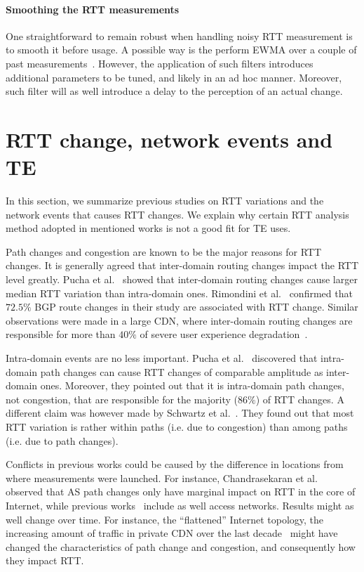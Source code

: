 \paragraph{Smoothing the RTT measurements} One straightforward to remain robust when handling noisy RTT measurement is to smooth it before usage. A possible way is the perform \ac{EWMA} over a couple of past measurements~\cite{Akella2008}. However, the application of such filters introduces additional parameters to be tuned, and likely in an ad hoc manner. Moreover, such filter will as well introduce a delay to the perception of an actual change.


\section{RTT change, network events and TE}
\label{sec:rtt_path}
In this section, we summarize previous studies on RTT variations and the network events that causes RTT changes.
We explain why certain RTT analysis method adopted in mentioned works is not a good fit for TE uses.

Path changes and congestion are known to be the major reasons for RTT changes.
It is generally agreed that inter-domain routing changes impact the RTT level greatly.
Pucha et al.~\cite{Pucha2007} showed that inter-domain routing changes cause larger median RTT variation than intra-domain ones.
Rimondini et al.~\cite{Rimondini2014} confirmed that $72.5\%$ BGP route changes in their study are associated with RTT change.
Similar observations were made in a large \ac{CDN}, where inter-domain routing changes are responsible for more than $40\%$ of severe user experience degradation~\cite{Zhu2012}.

Intra-domain events are no less important. Pucha et al.~\cite{Pucha2007} discovered that intra-domain path changes can cause RTT changes of comparable amplitude as inter-domain ones.
Moreover, they pointed out that it is intra-domain path changes, not congestion, that are responsible for the majority ($86\%$) of RTT changes. %
A different claim was however made by Schwartz et al.~\cite{Schwartz2010}. They found out that most RTT variation is rather within paths (i.e. due to congestion) than among paths (i.e. due to path changes).

Conflicts in previous works could be caused by the difference in locations from where measurements were launched.
For instance, Chandrasekaran et al.~\cite{Chandrasekaran} observed that AS path changes only have marginal impact on RTT in the core of Internet, while previous works~\cite{Pucha2007, Schwartz2010} include as well access networks.
Results might as well change over time. For instance, the ``flattened'' Internet topology, the increasing amount of traffic in private CDN over the last decade~\cite{Labovitz2011, Roughan2011} might have changed the characteristics of path change and congestion, and consequently how they impact RTT.

